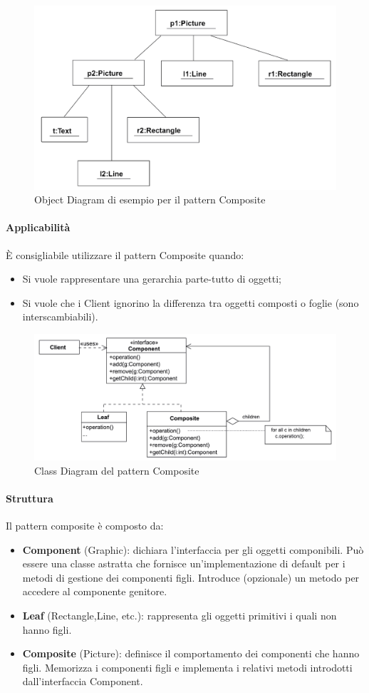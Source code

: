\begin{figure}[H]
    \centering
    \includegraphics[width=0.5\linewidth]{assets/pattern/composite/composite-object.png}
    \caption{Object Diagram di esempio per il pattern Composite}
\end{figure}

\newpage

\paragraph{Applicabilità} È consigliabile utilizzare il pattern Composite quando:
\begin{itemize}
    \item Si vuole rappresentare una gerarchia parte-tutto di oggetti;
    \item Si vuole che i Client ignorino la differenza tra oggetti composti o foglie (sono interscambiabili).
\end{itemize}

\begin{figure}[H]
    \centering
    \includegraphics[width=0.75\linewidth]{assets/pattern/composite/composite-struttura.png}
    \caption{Class Diagram del pattern Composite}
\end{figure}

\paragraph{Struttura} Il pattern composite è composto da:
\begin{itemize}
    \item \textbf{Component} (Graphic): dichiara l’interfaccia per gli oggetti componibili. Può essere una classe astratta che fornisce un’implementazione di default per i metodi di gestione dei componenti figli. Introduce (opzionale) un metodo per accedere al componente genitore. 
    \item \textbf{Leaf} (Rectangle,Line, etc.): rappresenta gli oggetti primitivi i quali non hanno figli. 
    \item \textbf{Composite} (Picture): definisce il comportamento dei componenti che hanno figli. Memorizza i componenti figli e implementa i relativi metodi introdotti dall’interfaccia Component.
\end{itemize}

